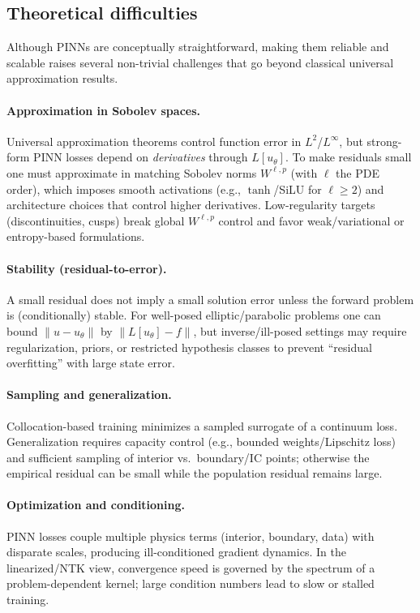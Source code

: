 \subsection{Theoretical difficulties}
Although PINNs are conceptually straightforward, making them reliable and scalable raises several non-trivial challenges that go beyond classical universal approximation results.

\paragraph{Approximation in Sobolev spaces.}
Universal approximation theorems control function error in $L^2$/$L^\infty$, but strong-form PINN losses depend on \emph{derivatives} through $L[u_\theta]$. 
To make residuals small one must approximate in matching Sobolev norms $W^{\ell,p}$ (with $\ell$ the PDE order), which imposes smooth activations (e.g., $\tanh$/SiLU for $\ell\!\ge\!2$) and architecture choices that control higher derivatives. 
Low-regularity targets (discontinuities, cusps) break global $W^{\ell,p}$ control and favor weak/variational or entropy-based formulations.

\paragraph{Stability (residual-to-error).}
A small residual does not imply a small solution error unless the forward problem is (conditionally) stable. 
For well-posed elliptic/parabolic problems one can bound $\|u-u_\theta\|$ by $\|L[u_\theta]-f\|$, but inverse/ill-posed settings may require regularization, priors, or restricted hypothesis classes to prevent ``residual overfitting'' with large state error.

\paragraph{Sampling and generalization.}
Collocation-based training minimizes a sampled surrogate of a continuum loss. 
Generalization requires capacity control (e.g., bounded weights/Lipschitz loss) and sufficient sampling of interior vs.\ boundary/IC points; otherwise the empirical residual can be small while the population residual remains large. 

\paragraph{Optimization and conditioning.}
PINN losses couple multiple physics terms (interior, boundary, data) with disparate scales, producing ill-conditioned gradient dynamics. 
In the linearized/NTK view, convergence speed is governed by the spectrum of a problem-dependent kernel; large condition numbers lead to slow or stalled training. 

